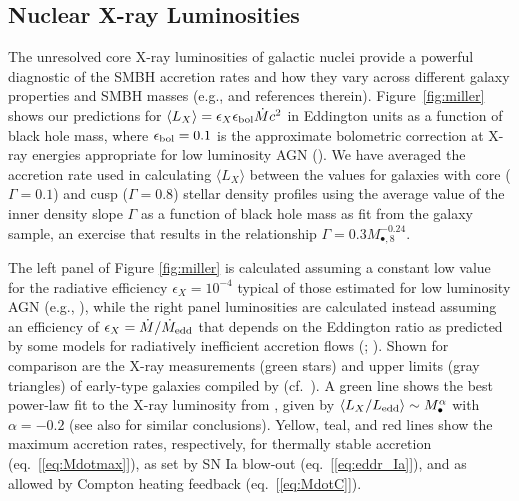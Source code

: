 \documentclass[usenatbib,fleqn]{mn2e}
\newcommand{\Mbh}[1][]{M_{\bullet#1}}
\newcommand{\Mbheight}{M_{\bullet,8}}
\begin{document}
\subsection{Nuclear X-ray Luminosities}
\label{sec:Lx}

The unresolved core X-ray luminosities of galactic nuclei provide a
powerful diagnostic of the SMBH accretion rates and how they vary
across different galaxy properties and SMBH masses (e.g.,
\citealt{Ho08} and references therein).  Figure~\ref{fig:miller} shows
our predictions for $\langle L_{X} \rangle =\epsilon_X \epsilon_{\rm
  bol} \dot{M} c^2$ in Eddington units as a function of black hole
mass, where $\epsilon_{\rm bol} = 0.1$ is the approximate bolometric
correction at X-ray energies appropriate for low luminosity AGN
(\citealt{Ho08}).  We have averaged the accretion rate used in
calculating $\langle L_X \rangle$ between the values for galaxies with
core ($\Gamma = 0.1$) and cusp ($\Gamma = 0.8$) stellar density
profiles using the average value of the inner density slope $\Gamma$
as a function of black hole mass as fit from the
\citet{LauerFaber+:2007a} galaxy sample, an exercise that results in
the relationship $\Gamma = 0.3 \Mbheight^{-0.24}$. 

The left panel of Figure \ref{fig:miller} is calculated assuming a
constant low value for the radiative efficiency $\epsilon_X = 10^{-4}$
typical of those estimated for low luminosity AGN (e.g.,
\citealt{Ho:2009a}), while the right panel luminosities are calculated
instead assuming an efficiency of $\epsilon_X= \dot{M}/\dot{M}_{\rm
  edd}$ that depends on the Eddington ratio as predicted by some
models for radiatively inefficient accretion flows
(\citealt{Narayan&Yi95}; \citealt{Narayan+98}).  Shown for comparison
are the X-ray measurements (green stars) and upper limits (gray
triangles) of early-type galaxies compiled by \citet{Miller+15}
(cf.~\citealt{Gallo+10}).  A green line shows the best power-law fit
to the X-ray luminosity from \citet{Miller+15}, given by $\langle
L_X/L_{\rm edd}\rangle \sim \Mbh^\alpha$ with $\alpha = -0.2$ (see also
\citep{Zhang+09, Pellegrini10, Gallo+10} for similar conclusions).
Yellow, teal, and red lines show the maximum accretion rates,
respectively, for thermally stable accretion (eq.~[\ref{eq:Mdotmax}]),
as set by SN Ia blow-out (eq.~[\ref{eq:eddr_Ia}]), and as allowed by
Compton heating feedback (eq.~[\ref{eq:MdotC}]).
\end{document}
